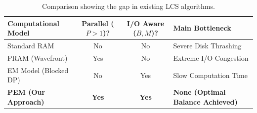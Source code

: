 \vspace{1em}
\begin{table}[h!] \centering 
\renewcommand{\arraystretch}{1.5}
\begin{tabular}{|l|c|c|p{4.6cm}|} 
\hline 
\textbf{Computational Model} & \textbf{Parallel ($P>1$)?} & \textbf{I/O Aware ($B, M$)?} & \textbf{Main Bottleneck} \\ 
\hline Standard RAM & No & No & Severe Disk Thrashing \\ \hline PRAM (Wavefront) & Yes & No & Extreme I/O Congestion 
\\ 
\hline EM Model (Blocked DP) & No & Yes & Slow Computation Time 
\\ 
\hline \textbf{PEM (Our Approach)} & \textbf{Yes} & \textbf{Yes} & \textbf{None (Optimal Balance Achieved)} 
\\ 
\hline \end{tabular} \caption{Comparison showing the gap in existing LCS algorithms.} \label{tab:novelty_comparison} \end{table}
